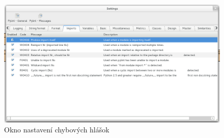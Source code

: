 \documentclass[11pt,oneside,final]{fithesis2}
\begin{document}
	\begin{figure}[htb]
	 \centering
	 \includegraphics[width=\textwidth]{images/settings}
	 \caption{Okno nastavení chybových hlášok}
	\end{figure}
		
\end{document}
